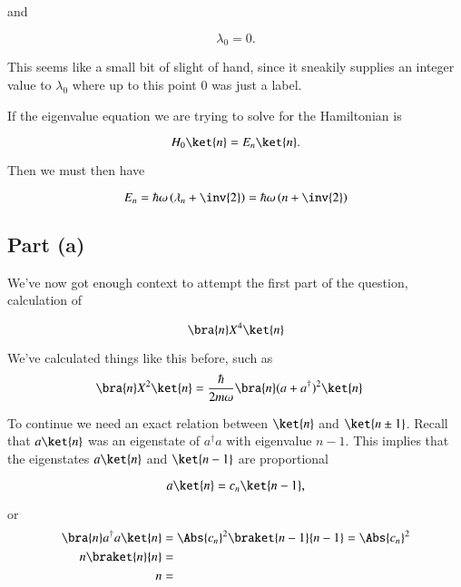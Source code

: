 and

\begin{equation}\label{eqn:phy456ps1:260}
\lambda_0 = 0.
\end{equation}

This seems like a small bit of slight of hand, since it sneakily supplies an integer value to $\lambda_0$ where up to this point $0$ was just a label.

If the eigenvalue equation we are trying to solve for the Hamiltonian is

\begin{equation}\label{eqn:phy456ps1:280}
H_0 \ket{n} = E_n \ket{n}.
\end{equation}

Then we must then have

\begin{equation}\label{eqn:phy456ps1:300}
E_n = \hbar \omega \left(\lambda_n + \inv{2} \right) = \hbar \omega \left(n + \inv{2} \right)
\end{equation}

\subsection{Part (a)}

We've now got enough context to attempt the first part of the question, calculation of

\begin{equation}\label{eqn:phy456ps1:320}
\bra{n} X^4 \ket{n}
\end{equation}

We've calculated things like this before, such as
\begin{align*}
\bra{n} X^2 \ket{n}
&=
\frac{\hbar}{2 m \omega} \bra{n} (a + a^\dagger)^2 \ket{n}
\end{align*}

To continue we need an exact relation between $\ket{n}$ and $\ket{n \pm 1}$.  Recall that $a \ket{n}$ was an eigenstate of $a^\dagger a$ with eigenvalue $n - 1$.  This implies that the eigenstates $a \ket{n}$ and $\ket{n-1}$ are proportional

\begin{equation}\label{eqn:phy456ps1:340}
a \ket{n} = c_n \ket{n - 1},
\end{equation}

or
\begin{align*}
\bra{n} a^\dagger a \ket{n} &= \Abs{c_n}^2 \braket{n - 1}{n-1} = \Abs{c_n}^2 \\
n \braket{n}{n} &= \\
n &=
\end{align*}


